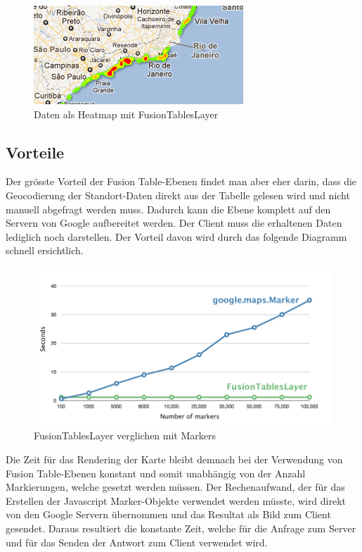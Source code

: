 \begin{figure}[htbp]
	\centering
	\includegraphics{images/gmap_fusiontableslayer_heatmap.png}
	\caption{Daten als Heatmap mit FusionTablesLayer}
	\label{fusiontableslayer-heatmap}
\end{figure}

\subsection{Vorteile}
Der grösste Vorteil der Fusion Table-Ebenen findet man aber eher darin, dass die Geocodierung der Standort-Daten direkt aus der Tabelle gelesen wird und nicht manuell abgefragt werden muss. Dadurch kann die Ebene komplett auf den Servern von Google aufbereitet werden. Der Client muss die erhaltenen Daten lediglich noch darstellen. Der Vorteil davon wird durch das folgende Diagramm schnell ersichtlich.

\begin{figure}[htbp]
	\centering
	\includegraphics[scale=0.5]{images/gmap_fusiontableslayer_vs_markers.png}
	\caption{FusionTablesLayer verglichen mit Markers}
	\label{fusiontableslayer-compare_markers}
\end{figure}

Die Zeit für das Rendering der Karte bleibt demnach bei der Verwendung von Fusion Table-Ebenen konstant und somit unabhängig von der Anzahl Markierungen, welche gesetzt werden müssen. Der Rechenaufwand, der für das Erstellen der Javascript Marker-Objekte verwendet werden müsste, wird direkt von den Google Servern übernommen und das Resultat als Bild zum Client gesendet. Daraus resultiert die konstante Zeit, welche für die Anfrage zum Server und für das Senden der Antwort zum Client verwendet wird.

